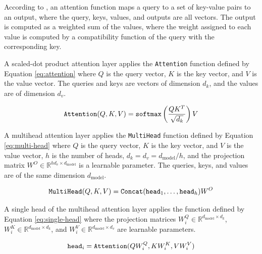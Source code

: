 According to \cite{vaswani2017attention}, an attention function maps a query to a set of key-value pairs to an output, where the query, keys, values, and outputs are all vectors. The output is computed as a weighted sum of the values, where the weight assigned to each value is computed by a compatibility function of the query with the corresponding key.

A scaled-dot product attention layer applies the \verb|Attention| function defined by Equation \ref{eq:attention} where $Q$ is the query vector, $K$ is the key vector, and $V$ is the value vector. The queries and keys are vectors of dimension $d_k$, and the values are of dimension $d_v$.

\begin{equation}
    \verb|Attention|(Q, K, V) = \verb|softmax|\left(\frac{QK^T}{\sqrt{d_k}}\right) V
    \label{eq:attention}
\end{equation}

A multihead attention layer applies the \verb|MultiHead| function defined by Equation \ref{eq:multi-head} where $Q$ is the query vector, $K$ is the key vector, and $V$ is the value vector, $h$ is the number of heads, $d_k = d_v = d_{\text{model}}/h$, and the projection matrix $W^O \in \mathbb{R}^{hd_v \times d_\text{model}}$ is a learnable parameter. The queries, keys, and values are of the same dimension $d_{\text{model}}$.

\begin{equation}
    \verb|MultiHead|(Q, K, V) = \verb|Concat|(\verb|head|_1,\dots,\verb|head|_h)W^O
    \label{eq:multi-head}
\end{equation}

A single head of the multihead attention layer applies the function defined by Equation \ref{eq:single-head} where the projection matrices $W_i^Q \in \mathbb{R}^{d_\text{model} \times d_k}$, $W_i^K \in \mathbb{R}^{d_\text{model} \times d_k}$, and $W_i^V \in \mathbb{R}^{d_\text{model} \times d_v}$ are learnable parameters.

\begin{equation}
    \verb|head|_i = \verb|Attention|(QW_i^Q, KW_i^K, VW_i^V)
    \label{eq:single-head}
\end{equation}


